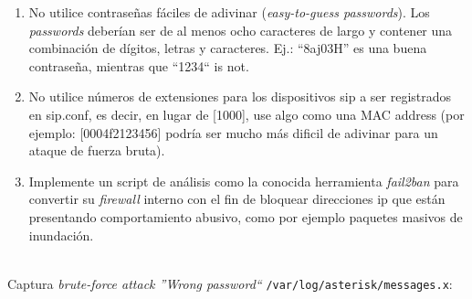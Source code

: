 \documentclass[a4paper,12pt]{report}
\begin{document}
{\begin{enumerate}
  \item No utilice contraseñas fáciles de adivinar (\emph{easy-to-guess
passwords}). Los \emph{passwords} deberían ser de al menos ocho caracteres de largo y
contener una combinación de dígitos, letras y caracteres. Ej.: ``8aj03H''
es una buena contraseña, mientras que ``1234`` is not.
  \item No utilice números de extensiones para los dispositivos \ac{sip} a ser
registrados en sip.conf, es decir, en lugar de [1000], use algo como una MAC
address (por ejemplo: [0004f2123456] podría ser mucho más dificil de
adivinar para un ataque de fuerza bruta).
  \item Implemente un script de análisis como la conocida herramienta \emph{fail2ban} para
convertir su \emph{firewall} interno con el fin de bloquear direcciones \ac{ip} que están
presentando comportamiento abusivo, como por ejemplo paquetes masivos de
inundación.
\end{enumerate}
\cite{madsen}\\  

Captura \emph{brute-force attack ''Wrong password``} \texttt{/var/log/asterisk/messages.x}:

}
\end{document}
